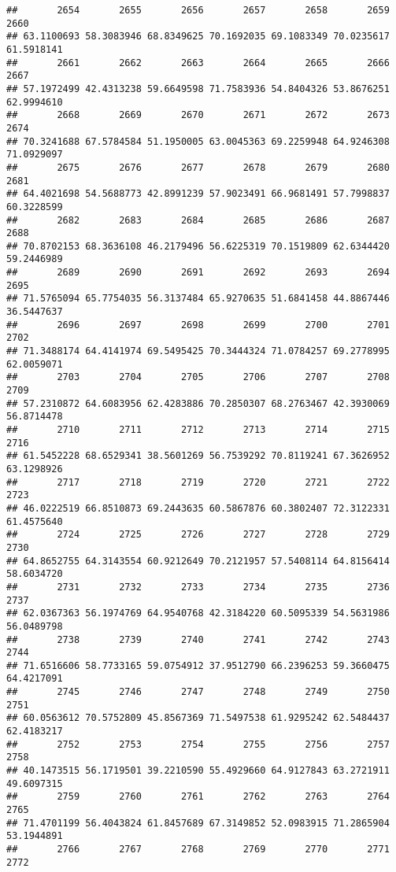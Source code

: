 \documentclass[
]{article}
\begin{document}
\begin{verbatim}
##       2654       2655       2656       2657       2658       2659       2660 
## 63.1100693 58.3083946 68.8349625 70.1692035 69.1083349 70.0235617 61.5918141 
##       2661       2662       2663       2664       2665       2666       2667 
## 57.1972499 42.4313238 59.6649598 71.7583936 54.8404326 53.8676251 62.9994610 
##       2668       2669       2670       2671       2672       2673       2674 
## 70.3241688 67.5784584 51.1950005 63.0045363 69.2259948 64.9246308 71.0929097 
##       2675       2676       2677       2678       2679       2680       2681 
## 64.4021698 54.5688773 42.8991239 57.9023491 66.9681491 57.7998837 60.3228599 
##       2682       2683       2684       2685       2686       2687       2688 
## 70.8702153 68.3636108 46.2179496 56.6225319 70.1519809 62.6344420 59.2446989 
##       2689       2690       2691       2692       2693       2694       2695 
## 71.5765094 65.7754035 56.3137484 65.9270635 51.6841458 44.8867446 36.5447637 
##       2696       2697       2698       2699       2700       2701       2702 
## 71.3488174 64.4141974 69.5495425 70.3444324 71.0784257 69.2778995 62.0059071 
##       2703       2704       2705       2706       2707       2708       2709 
## 57.2310872 64.6083956 62.4283886 70.2850307 68.2763467 42.3930069 56.8714478 
##       2710       2711       2712       2713       2714       2715       2716 
## 61.5452228 68.6529341 38.5601269 56.7539292 70.8119241 67.3626952 63.1298926 
##       2717       2718       2719       2720       2721       2722       2723 
## 46.0222519 66.8510873 69.2443635 60.5867876 60.3802407 72.3122331 61.4575640 
##       2724       2725       2726       2727       2728       2729       2730 
## 64.8652755 64.3143554 60.9212649 70.2121957 57.5408114 64.8156414 58.6034720 
##       2731       2732       2733       2734       2735       2736       2737 
## 62.0367363 56.1974769 64.9540768 42.3184220 60.5095339 54.5631986 56.0489798 
##       2738       2739       2740       2741       2742       2743       2744 
## 71.6516606 58.7733165 59.0754912 37.9512790 66.2396253 59.3660475 64.4217091 
##       2745       2746       2747       2748       2749       2750       2751 
## 60.0563612 70.5752809 45.8567369 71.5497538 61.9295242 62.5484437 62.4183217 
##       2752       2753       2754       2755       2756       2757       2758 
## 40.1473515 56.1719501 39.2210590 55.4929660 64.9127843 63.2721911 49.6097315 
##       2759       2760       2761       2762       2763       2764       2765 
## 71.4701199 56.4043824 61.8457689 67.3149852 52.0983915 71.2865904 53.1944891 
##       2766       2767       2768       2769       2770       2771       2772 

\end{verbatim}
\end{document}
